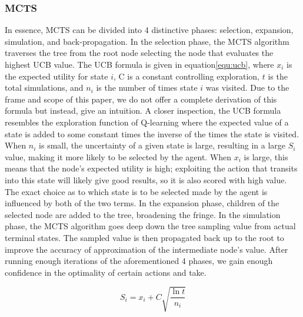 \documentclass{article}
\begin{document}
\subsubsection{MCTS}
In essence, MCTS can be divided into 4 distinctive phases: selection, expansion, simulation, and back-propagation. In the selection phase, the MCTS algorithm traverses the tree from the root node selecting the node that evaluates the highest UCB value. The UCB formula is given in equation\ref{equ:ucb}, where $x_i$ is the expected utility for state $i$, C is a constant controlling exploration, $t$ is the total simulations, and $n_i$ is the number of times state $i$ was visited.  Due to the frame and scope of this paper, we do not offer a complete derivation of this formula but instead, give an intuition. A closer inspection, the UCB formula resembles the exploration function of Q-learning where the expected value of a state is added to some constant times the inverse of the times the state is visited. When $n_i$ is small, the uncertainty of a given state is large, resulting in a large $S_i$ value, making it more likely to be selected by the agent. When $x_i$ is large, this means that the node's expected utility is high; exploiting the action that transits into this state will likely give good results, so it is also scored with high value. The exact choice as to which state is to be selected made by the agent is influenced by both of the two terms. In the expansion phase, children of the selected node are added to the tree, broadening the fringe. In the simulation phase, the MCTS algorithm goes deep down the tree sampling value from actual terminal states. The sampled value is then propagated back up to the root to improve the accuracy of approximation of the intermediate node's value. After running enough iterations of the aforementioned 4 phases, we gain enough confidence in the optimality of certain actions and take. 

\begin{equation}
    S_i = x_i + C\sqrt{\frac{\ln{t}}{n_i}}
    \label{equ:ucb}
\end{equation}
\end{document}
